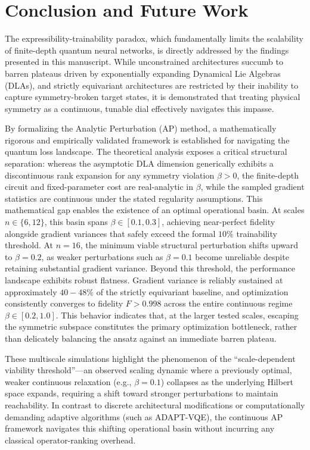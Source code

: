 \documentclass[10pt,twocolumn]{article}
\theoremstyle{remark}
\begin{document}
\section*{Conclusion and Future Work}

The expressibility-trainability paradox, which fundamentally limits the scalability of finite-depth quantum neural networks, is directly addressed by the findings presented in this manuscript. While unconstrained architectures succumb to barren plateaus driven by exponentially expanding Dynamical Lie Algebras (DLAs), and strictly equivariant architectures are restricted by their inability to capture symmetry-broken target states, it is demonstrated that treating physical symmetry as a continuous, tunable dial effectively navigates this impasse.

By formalizing the Analytic Perturbation (AP) method, a mathematically rigorous and empirically validated framework is established for navigating the quantum loss landscape. The theoretical analysis exposes a critical structural separation: whereas the asymptotic DLA dimension generically exhibits a discontinuous rank expansion for any symmetry violation $\beta > 0$, the finite-depth circuit and fixed-parameter cost are real-analytic in $\beta$, while the sampled gradient statistics are continuous under the stated regularity assumptions. This mathematical gap enables the existence of an optimal operational basin. At scales $n \in \{6, 12\}$, this basin spans $\beta \in [0.1, 0.3]$, achieving near-perfect fidelity alongside gradient variances that safely exceed the formal $10\%$ trainability threshold. At $n=16$, the minimum viable structural perturbation shifts upward to $\beta=0.2$, as weaker perturbations such as $\beta=0.1$ become unreliable despite retaining substantial gradient variance. Beyond this threshold, the performance landscape exhibits robust flatness. Gradient variance is reliably sustained at approximately $40{-}48\%$ of the strictly equivariant baseline, and optimization consistently converges to fidelity $F>0.998$ across the entire continuous regime $\beta \in [0.2, 1.0]$. This behavior indicates that, at the larger tested scales, escaping the symmetric subspace constitutes the primary optimization bottleneck, rather than delicately balancing the ansatz against an immediate barren plateau.

These multiscale simulations highlight the phenomenon of the ``scale-dependent viability threshold''---an observed scaling dynamic where a previously optimal, weaker continuous relaxation (e.g., $\beta=0.1$) collapses as the underlying Hilbert space expands, requiring a shift toward stronger perturbations to maintain reachability. In contrast to discrete architectural modifications or computationally demanding adaptive algorithms (such as ADAPT-VQE), the continuous AP framework navigates this shifting operational basin without incurring any classical operator-ranking overhead.
\end{document}
